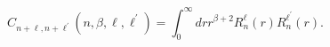 \begin{equation}
C_{n+\ell ,n+\ell ^{\prime }}\left( n,\beta ,\ell ,\ell ^{\prime }\right)
=\int_{0}^{\infty }drr^{\beta +2}R_{n}^{\ell }(r)R_{n}^{\ell ^{\prime }}(r).
\end{equation}

